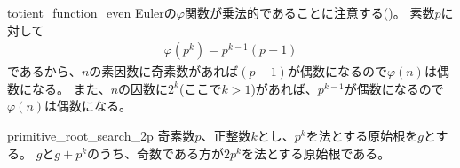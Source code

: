 \begin{lmProof}{totient_function_even}
Eulerの$\varphi$関数が乗法的であることに注意する()。
素数$p$に対して
\begin{align*}
\varphi(p^k) = p^{k-1}(p-1)
\end{align*}
であるから、$n$の素因数に奇素数があれば$(p-1)$が偶数になるので$\varphi(n)$は偶数になる。
また、$n$の因数に$2^k$(ここで$k>1$)があれば、$p^{k-1}$が偶数になるので$\varphi(n)$は偶数になる。
\end{lmProof}

\begin{Prop}{}{primitive_root_search_2p}
奇素数$p$、正整数$k$とし、$p^k$を法とする原始根を$g$とする。
$g$と$g+p^k$のうち、奇数である方が$2p^k$を法とする原始根である。
\end{Prop}

